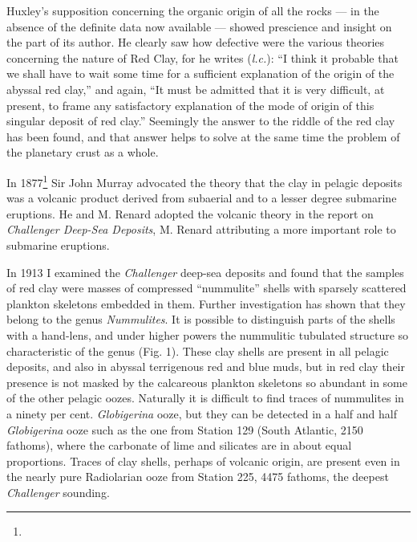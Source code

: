 \documentclass[a4paper, 12pt, oneside]{article}
\begin{document}
Huxley's supposition concerning the organic origin of all the rocks --- in the absence of the definite data now available --- showed prescience and insight on the part of its author. He clearly saw how defective were the various theories concerning the nature of Red Clay, for he writes (\emph{l.c.}): ``I think it probable that we shall have to wait some time for a sufficient explanation of the origin of the abyssal red clay,'' and again, ``It must be admitted that it is very difficult, at present, to frame any satisfactory explanation of the mode of origin of this singular deposit of red clay.'' Seemingly the answer to the riddle of the red clay has been found, and that answer helps to solve at the same time the problem of the planetary crust as a whole.

In 1877\footnote{} Sir John Murray advocated the theory that the clay in pelagic deposits was a volcanic product derived from subaerial and to a lesser degree submarine eruptions. He and M. Renard adopted the volcanic theory in the report on \emph{Challenger Deep-Sea Deposits}, M. Renard attributing a more important role to submarine eruptions.

In 1913 I examined the \emph{Challenger} deep-sea deposits and found that the samples of red clay were masses of compressed ``nummulite'' shells with sparsely scattered plankton skeletons embedded in them. Further investigation has shown that they belong to the genus \emph{Nummulites}. It is possible to distinguish parts of the shells with a hand-lens, and under higher powers the nummulitic tubulated structure so characteristic of the genus (Fig. 1). These clay shells are present in all pelagic deposits, and also in abyssal terrigenous red and blue muds, but in red clay their presence is not masked by the calcareous plankton skeletons so abundant in some of the other pelagic oozes. Naturally it is difficult to find traces of nummulites in a ninety per cent. \emph{Globigerina} ooze, but they can be detected in a half and half \emph{Globigerina} ooze such as the one from Station 129 (South Atlantic, 2150 fathoms), where the carbonate of lime and silicates are in about equal proportions. Traces of clay shells, perhaps of volcanic origin, are present even in the nearly pure Radiolarian ooze from Station 225, 4475 fathoms, the deepest \emph{Challenger} sounding.
\end{document}
